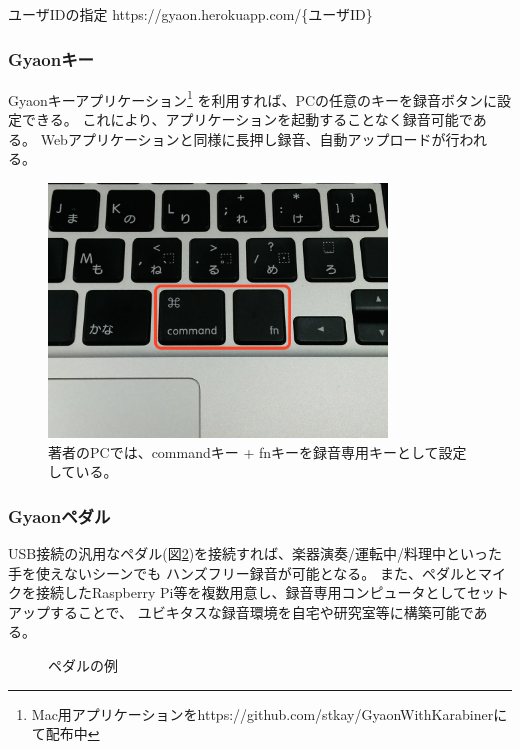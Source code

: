 \begin{itembox}[l]
{ユーザIDの指定}
https://gyaon.herokuapp.com/\{ユーザID\}
\end{itembox}

\subsubsection{Gyaonキー}
Gyaonキーアプリケーション\footnote{\textsf{Mac用アプリケーションをhttps://github.com/stkay/GyaonWithKarabinerにて配布中}}
を利用すれば、PCの任意のキーを録音ボタンに設定できる。
これにより、アプリケーションを起動することなく録音可能である。
Webアプリケーションと同様に長押し録音、自動アップロードが行われる。

\begin{figure}[H]
\centering
\includegraphics[width=9cm]{images/key.png}
\caption{著者のPCでは、commandキー + fnキーを録音専用キーとして設定している。}
\label{key}
\end{figure}

\subsubsection{Gyaonペダル}
USB接続の汎用なペダル(図\ref{pedal})を接続すれば、楽器演奏/運転中/料理中といった手を使えないシーンでも
ハンズフリー録音が可能となる。
また、ペダルとマイクを接続したRaspberry Pi等を複数用意し、録音専用コンピュータとしてセットアップすることで、
ユビキタスな録音環境を自宅や研究室等に構築可能である。

\begin{figure}[H]
\centering
{}
\caption{ペダルの例}
\label{pedal}
\end{figure}

